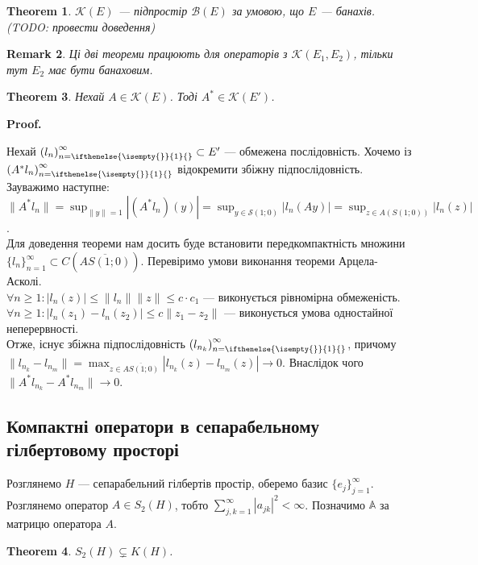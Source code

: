 \documentclass[a4paper, 10pt]{article}
\makeatletter
\theoremstyle{theoremdd}
\newtheorem{theorem}{Theorem}[subsection]
\theoremstyle{theoremdd}
\theoremstyle{theoremdd}
\theoremstyle{theoremdd}
\theoremstyle{theoremdd}
\theoremstyle{theoremdd}
\newtheorem{remark}[theorem]{Remark}
\theoremstyle{theoremdd}
\theoremstyle{theoremdd}
\newcommand{\sequence}[2][]{\left({#2}\right)_{n=\ifthenelse{\isempty{#1}}{1}{#1}}^{\infty}}
\renewenvironment{proof}[1][Proof.\\]{\par
\pushQED{\hfill \qed}%
\normalfont \topsep6\p@\@plus6\p@\relax
\trivlist
\item\relax
{\bfseries
#1\@addpunct{.}}\hspace\labelsep\ignorespaces
}{%
\popQED\endtrivlist\@endpefalse
}
\makeatother
\begin{document}
\begin{theorem}
$\mathcal{K}(E)$ --- підпростір $\mathcal{B}(E)$ за умовою, що $E$ --- банахів.\\
(TODO: провести доведення)
\end{theorem}

\begin{remark}
Ці дві теореми працюють для операторів з $\mathcal{K}(E_1,E_2)$, тільки тут $E_2$ має бути банаховим.
\end{remark}

\begin{theorem}
Нехай $A \in \mathcal{K}(E)$. Тоді $A^* \in \mathcal{K}(E')$.
\end{theorem}

\begin{proof}
Нехай $\sequence{l_n} \subset E'$ --- обмежена послідовність. Хочемо із $\sequence{A^*l_n}$ відокремити збіжну підпослідовність. Зауважимо наступне:\\
$\displaystyle \| A^*l_n \| = \sup_{ \|y\| = 1} |(A^*l_n)(y)| = \sup_{y \in \mathcal{S}(1;0)} |l_n(Ay)| = \sup_{z \in A(S(1;0))} |l_n(z)|$.\\
Для доведення теореми нам досить буде встановити передкомпактність множини $\{l_n\}_{n=1}^\infty \subset C(\overline{AS(1;0)})$. Перевіримо умови виконання теореми Арцела-Асколі.\\
$\forall n \ge 1: |l_n(z)| \leq \|l_n\| \|z\| \leq c \cdot c_1$ --- виконується рівномірна обмеженість.\\
$\forall n \geq 1: |l_n(z_1) - l_n(z_2)| \leq c\|z_1 - z_2\|$ --- виконується умова одностайної неперервності.\\
Отже, існує збіжна підпослідовність $\sequence{l_{n_k}}$, причому $\| l_{n_k} - l_{n_m} \| = \displaystyle\max_{z \in \overline{AS(1;0)}} |l_{n_k}(z) - l_{n_m}(z)| \to 0$. Внаслідок чого $\|A^* l_{n_k} - A^* l_{n_m}\| \to 0$.
\end{proof}

\subsection{Компактні оператори в сепарабельному гілбертовому просторі}
Розглянемо $H$ --- сепарабельний гілбертів простір, оберемо базис $\{e_j\}_{j=1}^\infty$. Розглянемо оператор $A \in S_2(H)$, тобто $\displaystyle\sum_{j,k=1}^\infty |a_{jk}|^2 < \infty$. Позначимо $\mathbb{A}$ за матрицю оператора $A$.

\begin{theorem}
$S_2(H) \subsetneq K(H)$.
\end{theorem}
\end{document}
